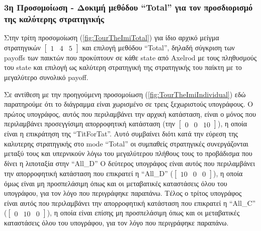 \documentclass[12pt]{article}
\begin{document}
\subsubsection{3η Προσομοίωση - Δοκιμή μεθόδου ``Total'' για τον προσδιορισμό της καλύτερης στρατηγικής}
Στην τρίτη προσομοίωση (\ref{fig:TourTheImiTotal}) για ίδιο αρχικό μείγμα στρατηγικών $\begin{bmatrix}1&4&5\end{bmatrix}$ και επιλογή μεθόδου ``Total'', δηλαδή σύγκριση των payoffs των παικτών που προκύπτουν σε κάθε state από Axelrod με τους πληθυσμούς του state και επιλογή ως καλύτερη στρατηγική της στρατηγικής του παίκτη με το μεγαλύτερο συνολικό payoff.

Σε αντίθεση με την προηγούμενη προσομοίωση (\ref{fig:TourTheImiIndividual}) εδώ παρατηρούμε ότι το διάγραμμα είναι χωρισμένο σε τρεις ξεχωριστούς υπογράφους.
Ο πρώτος υπογράφος, αυτός που περιλαμβάνει την αρχική κατάσταση, είναι ο μόνος που περιλαμβάνει προσεγγίσιμη απορροφητική κατάσταση (την $\begin{bmatrix}0&0&10\end{bmatrix}$), η οποία είναι η επικράτηση της ``TitForTat''. Αυτό συμβαίνει διότι κατά την εύρεση της καλυτερης στρατηγικής στο mode ``Total'' οι συμπαθείς στρατηγικές συνεργάζονται μεταξύ τους και υπερνικούν λόγω του μεγαλύτερου πλήθους τους το προβάδισμα που δίνει η λιποταξία στην ``All\_D''
Ο δεύτερος υπογράφος είναι αυτός που περιλαμβάνει την απορροφητική κατάσταση που επικρατεί η ``All\_D'' ($\begin{bmatrix}10&0&0\end{bmatrix}$), η οποία όμως είναι μη προσπελάσιμη όπως και οι μεταβατικές καταστάσεις όλου του υπογράφου, για τον λόγο που περιγράφηκε παραπάνω.
Τέλος ο τρίτος υπογράφος είναι αυτός που περιλαμβάνει την απορροφητική κατάσταση που επικρατεί η ``All\_C'' ($\begin{bmatrix}0&10&0\end{bmatrix}$), η οποία είναι επίσης μη προσπελάσιμη όπως και οι μεταβατικές καταστάσεις όλου του υπογράφου, για τον λόγο που περιγράφηκε παραπάνω.
\end{document}
